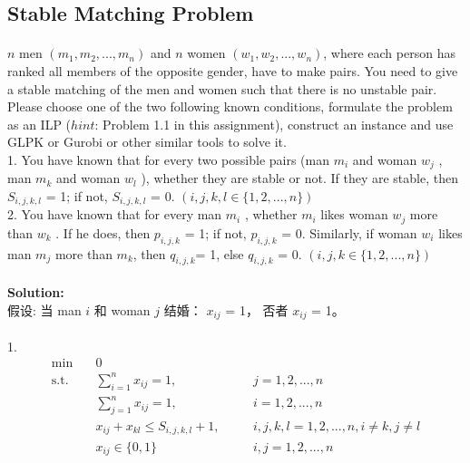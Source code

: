 \documentclass[11pt]{article}
\begin{document}
\begin{CJK*}{GBK}{song}
\section{Stable Matching Problem}

\paragraph{}$n$ men $(m_1 , m_2 ,..., m_n )$ and $n$ women $(w_1 , w_2 ,..., w_n )$, where each person has ranked all members of the opposite gender, have to make pairs. You need to give a stable matching of the men and women such that there is no unstable pair. Please choose one of the two following known conditions, formulate the problem as an ILP ($hint$: Problem 1.1 in this assignment), construct an instance
and use GLPK or Gurobi or other similar tools to solve it.\\
1. You have known that for every two possible pairs (man $m_i$ and woman $w_j$ , man $m_k$ and woman $w_l$ ), whether they are stable or not. If they are stable, then $S_{i,j,k,l}$ = 1; if not, $S_{i,j,k,l}$ = 0. $(i, j, k, l \in \{1, 2,..., n\} )$ \\
2. You have known that for every man $m_i$ , whether $m_i$ likes woman $w_j$ more than $w_k$ . If he does, then $p_{i,j,k}$ = 1; if not, $p_{i,j,k}$ = 0. Similarly, if woman $w_i$ likes man $m_j$ more than $m_k$, then $q_{i,j,k}$= 1, else $q_{i,j,k}$ = 0. $(i, j, k \in \{1, 2,..., n\})$

\paragraph{}\textbf{Solution:}\\
假设: 当 man $i$ 和 woman $j$ 结婚： $x_{ij}$ = 1， 否者 $x_{ij}$ = 1。
\paragraph{}
1.
\begin{alignat*}{2}
\min\quad & 0 &{}& \tag{LP2} \label{eqn - lp}\\
\mbox{s.t.}\quad
 & \sum^{n}_{i=1}x_{ij}  = 1, &\quad& j = 1,2,...,n\\
 & \sum^{n}_{j=1}x_{ij}  = 1, &\quad& i = 1,2,...,n\\
 & x_{ij} + x_{kl} \leq S_{i,j,k,l}+1, &\quad& i,j,k,l = 1,2,...,n, i \neq k, j \neq l\\
 & x_{ij} \in \{0,1\} &{}& i,j = 1,2,...,n           %
\end{alignat*}


\end{CJK*}
\end{document}
